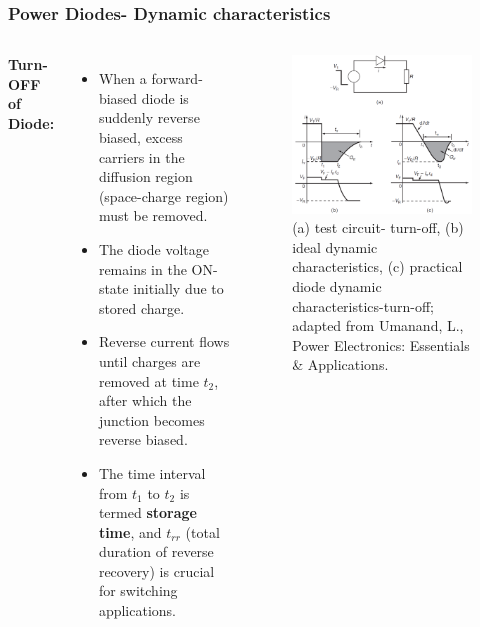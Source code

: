 \begin{frame}
    \frametitle{Power Diodes- Dynamic characteristics}
    \begin{columns}
        \textbf{Turn-OFF of Diode:}
        \begin{itemize}
            \item When a forward-biased diode is suddenly reverse biased, excess carriers in the diffusion region (space-charge region) must be removed.
            \item The diode voltage remains in the ON-state initially due to stored charge.
            \item Reverse current flows until charges are removed at time $t_2$, after which the junction becomes reverse biased.
            \item The time interval from $t_1$ to $t_2$ is termed \textbf{storage time}, and $t_{rr}$ (total duration of reverse recovery) is crucial for switching applications.
        \end{itemize}
        \begin{figure}
            \centering
            \includegraphics[scale=0.25]{fig/lec04/dynamic_characteristics_diode.png}
            \caption{(a) test circuit- turn-off, (b) ideal dynamic characteristics, (c) practical diode dynamic characteristics-turn-off; adapted from Umanand, L., Power Electronics: Essentials \& Applications.}
            \label{fig:dynamic_diode_characteristics}
        \end{figure}
    \end{columns}
\end{frame}

